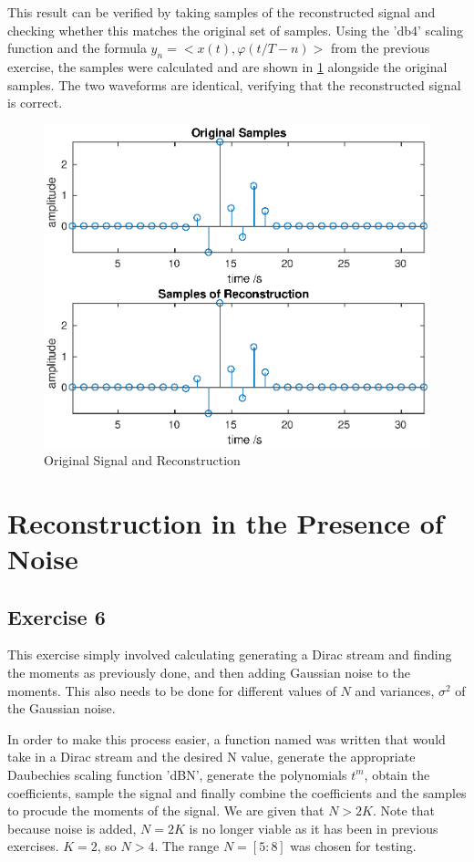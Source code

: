 \documentclass[a4paper]{article}
\begin{document}
This result can be verified by taking samples of the reconstructed signal and checking whether this matches the original set of samples. Using the 'db4' scaling function and the formula $y_n = <x(t),\varphi(t/T-n)>$ from the previous exercise, the samples were calculated and are shown in \ref{fig:ex5_1} alongside the original samples. The two waveforms are identical, verifying that the reconstructed signal is correct.

\begin{figure}[H]
    \centering
    \includegraphics[width=\textwidth]{../images/ex5_2}
    \caption{Original Signal and Reconstruction}
    \label{fig:ex5_1}
\end{figure}


\section{Reconstruction in the Presence of Noise}
\subsection{Exercise 6}

This exercise simply involved calculating generating a Dirac stream and finding the moments as previously done, and then adding Gaussian noise to the moments. This also needs to be done for different values of $N$ and variances, $\sigma^2$ of the Gaussian noise. 

In order to make this process easier, a function named  was written that would take in a Dirac stream and the desired N value, generate the appropriate Daubechies scaling function 'dBN', generate the polynomials $t^m$, obtain the coefficients, sample the signal and finally combine the coefficients and the samples to procude the moments of the signal. We are given that $N > 2K$. Note that because noise is added, $N = 2K$ is no longer viable as it has been in previous exercises. $K=2$, so $N >4$. The range $N = [5:8]$ was chosen for testing.
\end{document}
